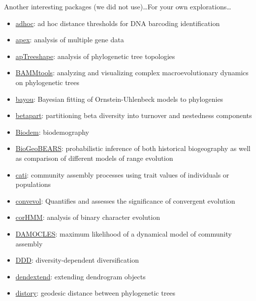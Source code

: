 \documentclass[compress, ucs, xelatex, 11pt, xcolor=svgnames,
  hyperref={
    bookmarks=true,
    unicode=true,
    colorlinks=true,
    pdftitle={Molecular data in R},
    plainpages=false,
    pdfauthor={Vojtech Zeisek},
    pdfsubject={Course about phylogeny and evolution in R},
    pdfcreator={XeLaTeX},
    pdfkeywords={R, evolution, phylogeny, molecular data},
    linkcolor=Tomato,
    anchorcolor=SaddleBrown,
    citecolor=Goldenrod,
    filecolor=DarkMagenta,
    menucolor=Sienna,
    urlcolor=DarkTurquoise,
    pdftex},
  url={hyphens, lowtilde} %
  ]{beamer}
\begin{document}
\begin{frame}[allowframebreaks]{Another interesting packages (we did not use)\ldots}{For your own explorations\ldots}
  \begin{itemize}
    \item \href{https://CRAN.R-project.org/package=adhoc}{adhoc}: ad hoc distance thresholds for DNA barcoding identification
    \item \href{https://CRAN.R-project.org/package=apex}{apex}: analysis of multiple gene data
    \item \href{https://CRAN.R-project.org/package=apTreeshape}{apTreeshape}: analysis of phylogenetic tree topologies
    \item \href{https://CRAN.R-project.org/package=BAMMtools}{BAMMtools}: analyzing and visualizing complex macroevolutionary dynamics on phylogenetic trees
    \item \href{https://CRAN.R-project.org/package=bayou}{bayou}: Bayesian fitting of Ornstein-Uhlenbeck models to phylogenies
    \item \href{https://CRAN.R-project.org/package=betapart}{betapart}: partitioning beta diversity into turnover and nestedness components
    \item \href{https://CRAN.R-project.org/package=Biodem}{Biodem}: biodemography
    \item \href{https://CRAN.R-project.org/package=BioGeoBEARS}{BioGeoBEARS}: probabilistic inference of both historical biogeography as well as comparison of different models of range evolution
    \item \href{https://CRAN.R-project.org/package=cati}{cati}: community assembly processes using trait values of individuals or populations
    \item \href{https://CRAN.R-project.org/package=convevol}{convevol}: Quantifies and assesses the significance of convergent evolution
    \item \href{https://CRAN.R-project.org/package=corHMM}{corHMM}: analysis of binary character evolution
    \item \href{https://CRAN.R-project.org/package=DAMOCLES}{DAMOCLES}: maximum likelihood of a dynamical model of community assembly
    \item \href{https://CRAN.R-project.org/package=DDD}{DDD}: diversity-dependent diversification
    \item \href{https://CRAN.R-project.org/package=dendextend}{dendextend}: extending dendrogram objects
    \item \href{https://CRAN.R-project.org/package=distory}{distory}: geodesic distance between phylogenetic trees

\end{itemize}
\end{frame}
\end{document}
